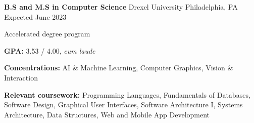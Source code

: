 

\begin{cventries}

  \cventry
  {\textbf{B.S and M.S in Computer Science}} %
  {Drexel University} %
  {Philadelphia, PA} %
  {Expected June 2023} %
  {
    \begin{cvitems} %
      \item {Accelerated degree program}
      \item {\textbf{GPA:} 3.53 / 4.00, \textit{cum laude}}
      \item {\textbf{Concentrations:} AI \& Machine Learning, Computer Graphics, Vision \& Interaction}
      \item {\color{darktext} \textbf{Relevant coursework:}
        Programming Languages,
        Fundamentals of Databases,
        Software Design,
        Graphical User Interfaces,
        Software Architecture I,
        Systems Architecture,
        Data Structures,
        Web and Mobile App Development
      }
    \end{cvitems}
  } 

\end{cventries}
